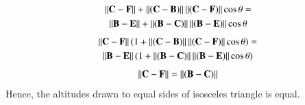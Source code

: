 \documentclass[journal,12pt,twocolumn]{IEEEtran}
\begin{document}
\begin{multline}
\left\lVert\mathbf{C-F}\right\rVert+\left\lVert\mathbf{(C-B)}\right\rVert\left\lVert\mathbf{(C-F)}\right\rVert\cos\theta=\\\left\lVert\mathbf{B-E}\right\rVert+\left\lVert\mathbf{(B-C)}\right\rVert\left\lVert\mathbf{(B-E)}\right\rVert\cos\theta
\end{multline}
\begin{multline}
\left\lVert\mathbf{C-F}\right\rVert(1+\left\lVert\mathbf{(C-B)}\right\rVert\left\lVert\mathbf{(C-F)}\right\rVert\cos\theta)=\\\left\lVert\mathbf{B-E}\right\rVert(1+\left\lVert\mathbf{(B-C)}\right\rVert\left\lVert\mathbf{(B-E)}\right\rVert\cos\theta)
\end{multline}
\begin{align}
\left\lVert\mathbf{C-F}\right\rVert=\left\lVert\mathbf{(B-C)}\right\rVert
\end{align}
Hence, the altitudes drawn to equal sides of isosceles triangle is equal.
 
\end{document}
